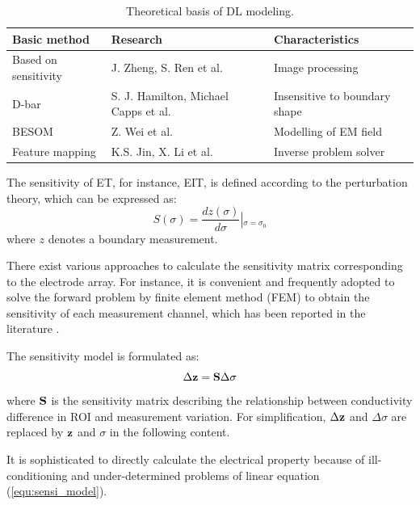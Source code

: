 \begin{table}
\caption{Theoretical basis of DL modeling.}\label{tab:model_basis}
  \centering
  \footnotesize{
  \begin{tabular}{p{2cm}p{2cm}p{3.5cm}}
  \hline
   Basic method & Research & Characteristics\\
  \hline
   Based on sensitivity & J. Zheng, S. Ren et al.\cite{Zheng2018A,Zheng2019ACNN,Zheng2020ADeep,Ren2020ATwo}& Image processing\\
   D-bar&  S. J. Hamilton, Michael Capps et al.\cite{Hamilton2018Deep,Hamilton2019Beltrami,Capps2021Reconstruction}&Insensitive to boundary shape\\
   BESOM & Z. Wei et al. \cite{Wei2019Dominant,Wei2020Induced} &Modelling of EM field\\
   Feature mapping&  K.S. Jin, X. Li et al. \cite{Jin2019A,Zheng2018AnAuto,Gao2019EIT,Li2021Electrical,Li2020One}&Inverse problem solver\\
  \hline
  \end{tabular}}
\end{table}

The sensitivity of ET, for instance, EIT, is defined according to the perturbation theory, which can be expressed as:
\begin{equation}\label{equ:sensi_define}
S(\sigma ) = \frac{{dz (\sigma )}}{{d\sigma }}\left| {_{\sigma  = {\sigma _0}}} \right.
\end{equation}
where $z$ denotes a boundary measurement.

There exist various approaches to calculate the sensitivity matrix corresponding to the electrode array. For instance, it is convenient and frequently adopted to solve the forward problem by finite element method (FEM) to obtain the sensitivity of each measurement channel, which has been reported in the literature \cite{Yin2010Sensitivity}.

The sensitivity model is formulated as:
\begin{equation}\label{equ:sensi_model}
{\Delta \bf{z}} = {\bf{S}} \Delta \sigma
\end{equation}
where $\bf{S}$ is the sensitivity matrix describing the relationship between conductivity difference in ROI and measurement variation. For simplification, $\Delta \bf{z}$ and $\Delta \sigma$ are replaced by $\bf{z}$ and $\sigma$ in the following content.

It is sophisticated to directly calculate the electrical property because of ill-conditioning and under-determined problems of linear equation (\ref{equ:sensi_model}).


